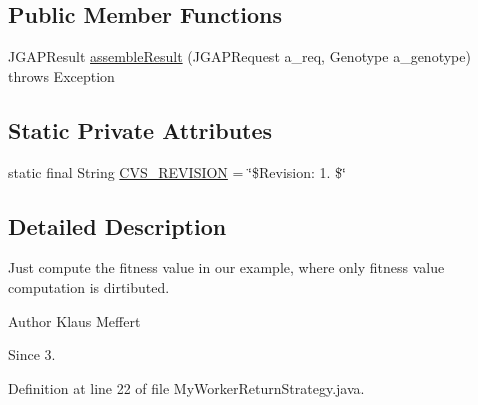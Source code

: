 \subsection*{Public Member Functions}
\begin{DoxyCompactItemize}
\item 
J\-G\-A\-P\-Result \hyperlink{classexamples_1_1grid_1_1fitness_distributed_1_1_my_worker_return_strategy_aa9a69112743d1fd60a59b5fd6f79db97}{assemble\-Result} (J\-G\-A\-P\-Request a\-\_\-req, Genotype a\-\_\-genotype)  throws Exception 
\end{DoxyCompactItemize}
\subsection*{Static Private Attributes}
\begin{DoxyCompactItemize}
\item 
static final String \hyperlink{classexamples_1_1grid_1_1fitness_distributed_1_1_my_worker_return_strategy_a5e853039ad1a2a3b1ade50b264f4067b}{C\-V\-S\-\_\-\-R\-E\-V\-I\-S\-I\-O\-N} = \char`\"{}\$Revision\-: 1. \$\char`\"{}
\end{DoxyCompactItemize}


\subsection{Detailed Description}
Just compute the fitness value in our example, where only fitness value computation is dirtibuted.

\begin{DoxyAuthor}{Author}
Klaus Meffert 
\end{DoxyAuthor}
\begin{DoxySince}{Since}
3. 
\end{DoxySince}


Definition at line 22 of file My\-Worker\-Return\-Strategy.\-java.



